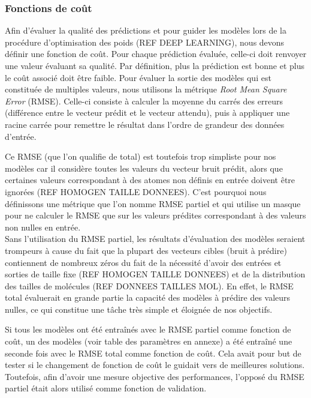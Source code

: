 \subsubsection{Fonctions de coût}

\par Afin d'évaluer la qualité des prédictions et pour guider les modèles lors de la procédure d'optimisation des poids (REF DEEP LEARNING), nous devons définir une fonction de coût. Pour chaque prédiction évaluée, celle-ci doit renvoyer une valeur évaluant sa qualité. Par définition, plus la prédiction est bonne et plus le coût associé doit être faible. Pour évaluer la sortie des modèles qui est constituée de multiples valeurs, nous utilisons la métrique \emph{Root Mean Square Error} (RMSE). Celle-ci consiste à calculer la moyenne du carrés des erreurs (différence entre le vecteur prédit et le vecteur attendu), puis à appliquer une racine carrée pour remettre le résultat dans l'ordre de grandeur des données d'entrée.\\

\par Ce RMSE (que l'on qualifie de total) est toutefois trop simpliste pour nos modèles car il considère toutes les valeurs du vecteur bruit prédit, alors que certaines valeurs correspondant à des atomes non définis en entrée doivent être ignorées (REF HOMOGEN TAILLE DONNEES). C'est pourquoi nous définissons une métrique que l'on nomme RMSE partiel et qui utilise un masque pour ne calculer le RMSE que sur les valeurs prédites correspondant à des valeurs non nulles en entrée.\\
Sans l'utilisation du RMSE partiel, les résultats d'évaluation des modèles seraient trompeurs à cause du fait que la plupart des vecteurs cibles (bruit à prédire) contiennent de nombreux zéros du fait de la nécessité d'avoir des entrées et sorties de taille fixe (REF HOMOGEN TAILLE DONNEES) et de la distribution des tailles de molécules (REF DONNEES TAILLES MOL). En effet, le RMSE total évaluerait en grande partie la capacité des modèles à prédire des valeurs nulles, ce qui constitue une tâche très simple et éloignée de nos objectifs.

\par Si tous les modèles ont été entraînés avec le RMSE partiel comme fonction de coût, un des modèles (voir table des paramètres en annexe) a été entraîné une seconde fois avec le RMSE total comme fonction de coût. Cela avait pour but de tester si le changement de fonction de coût le guidait vers de meilleures solutions. Toutefois, afin d'avoir une mesure objective des performances, l'opposé du RMSE partiel était alors utilisé comme fonction de validation.

